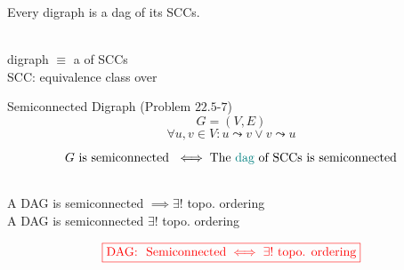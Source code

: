 
\begin{frame}{}
  \begin{theorem}
    Every digraph is a dag of its SCCs.
  \end{theorem}


  \pause
  \begin{center}
     \\[15pt] 

    digraph $\equiv$ a  of SCCs \\[6pt]

    SCC: equivalence class over 
  \end{center}
\end{frame}

\begin{frame}{}
  \begin{exampleblock}{Semiconnected Digraph (Problem $22.5$-$7$)}
    \[
      G = (V, E)
    \]
    \[
      \forall u,v \in V: u \leadsto v \lor v \leadsto u
    \]
  \end{exampleblock}

  \pause
  \vspace{0.60cm}
  \centerline{}

  \pause
  \vspace{0.80cm}
  \[
    G \text{ is semiconnected } \iff \text{The \textcolor{teal}{dag} of SCCs is semiconnected}
  \]
\end{frame}

\begin{frame}{}
  \begin{center}
     \\[20pt] \pause
    A DAG is semiconnected $\implies \exists!$ topo. ordering \\[15pt] \pause
    A DAG is semiconnected \red{$\Longleftarrow$} $\exists!$ topo. ordering
  \end{center}

  \pause
  \vspace{0.30cm}

  \pause
  \[
    \textcolor{red}{\boxed{\text{DAG: } \text{ Semiconnected} \iff \exists! \text{ topo. ordering}}}
  \]
\end{frame}

